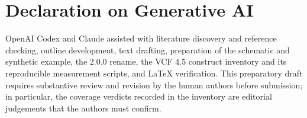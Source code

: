 \documentclass{ceurart}
\begin{document}
\section*{Declaration on Generative AI}
OpenAI Codex and Claude assisted with literature discovery and reference checking, outline development, text drafting, preparation of the schematic and synthetic example, the 2.0.0 rename, the VCF 4.5 construct inventory and its reproducible measurement scripts, and LaTeX verification. This preparatory draft requires substantive review and revision by the human authors before submission; in particular, the coverage verdicts recorded in the inventory are editorial judgements that the authors must confirm.


\clearpage

\end{document}
